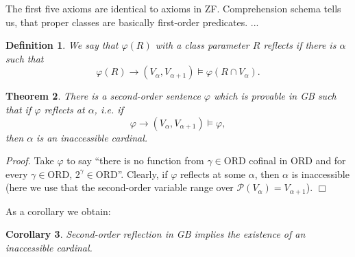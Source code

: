 \documentclass[12pt,a4paper]{article}
\newtheorem{theorem}{Theorem}[section]
\newtheorem{definition}[theorem]{Definition}
\newtheorem{Cor}[theorem]{Corollary}
\newenvironment{proof}
{\noindent \textit{Proof.}}
{\hspace*{\fill} $\Box$}
\newcommand{\power}[1]{\ensuremath{\mathscr{P}} (#1)}
\newcommand{\then}{\rightarrow}
\newcommand{\mx}{\mathrm}
\begin{document}
The first five axioms are identical to axioms in ZF. \newline
Comprehension schema tells us, that proper classes are basically first-order predicates.
...
 
\begin{definition}\label{def:reflBG}
We say that $\varphi(R)$ with a class parameter $R$ reflects if there is $\alpha$ such that
\begin{equation}
\varphi(R) \then (V_\alpha,V_{\alpha+1})\models \varphi(R\cap V_\alpha).
\end{equation} 
\end{definition}


\begin{theorem}\label{th:refl01}
There is a second-order sentence $\varphi$ which is provable in {\sf GB} such that if $\varphi$ reflects at $\alpha$, i.e. if
\begin{equation}
\varphi \then (V_\alpha,V_{\alpha+1}) \models \varphi,
\end{equation}
then $\alpha$ is an inaccessible cardinal.
\end{theorem}

\begin{proof}
Take $\varphi$ to say ``there is no function from $\gamma \in \mx{ORD}$ cofinal in $\mx{ORD}$ and for every $\gamma \in \mx{ORD}$, $2^\gamma \in \mx{ORD}$''. Clearly, if $\varphi$ reflects at some $\alpha$, then $\alpha$ is inaccessible (here we use that the second-order variable range over $\power{V_\alpha} = V_{\alpha+1}$).
\end{proof}

As a corollary we obtain:

\begin{Cor}\label{cor:refl01}
Second-order reflection in {\sf GB} implies the existence of an inaccessible cardinal.
\end{Cor}
\end{document}
